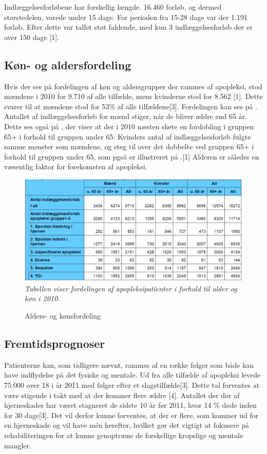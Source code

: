 Indlæggelsesforløbene har forskellig længde. 16.460 forløb, og dermed størstedelen, varede under 15 dage. For perioden fra 15-28 dage var der 1.191 forløb. Efter dette var tallet støt faldende, med kun 3 indlæggelsesforløb der er over 150 dage [1].

\subsection{Køn- og aldersfordeling}
Hvis der ses på fordelingen af køn og aldersgrupper der rammes af apopleksi, stod mændene i 2010 for 9.710 af alle tilfælde, mens kvinderne stod for 8.562 [1]. Dette svarer til at mændene stod for 53\% af alle tilfældene[3]. Fordelingen kan ses på .  
Antallet af indlæggelsesforløb for mænd stiger, når de bliver ældre end 65 år. Dette ses også på , der viser at der i 2010 næsten skete en fordobling i gruppen 65+ i forhold til gruppen under 65.
Kvinders antal af indlæggelsesforløb fulgte samme mønster som mændene, og steg til over det dobbelte ved gruppen 65+ i forhold til gruppen under 65, som pgså er illustreret på .[1] Alderen er således en væsentlig faktor for forekomsten af apopleksi.

\begin{figure}[H]
	\caption{Alders- og kønsfordeling}
	\label{AlderKoen}
	\centering
	\includegraphics[scale=.8]{figures/bProblemanalyse/MaendKvinder}
	\flushleft
	\textit{Tabellen viser fordelingen af apopleksipatienter i forhold til alder og køn i 2010.}
\end{figure}

\subsection{Fremtidsprognoser}
Patienterne kan, som tidligere nævnt, rammes af en række følger som både kan have indflydelse på det fysiske og mentale. Ud fra alle tilfælde af apopleksi levede 75.000 over 18 i år 2011 med følger efter et slagstilfælde[3]. Dette tal forventes at være stigende i takt med at der kommer flere ældre [4]. Antallet der dør af hjerneskader har været stagneret de sidste 10 år før 2011, hvor 14 \% døde inden for 30 dage[3]. Det vil derfor kunne forventes, at der er flere, som kommer ud for en hjerneskade og vil have mén herefter, hvilket gør det vigtigt at fokusere på rehabiliteringen for at kunne genoptræne de forskellige kropslige og mentale mangler.

